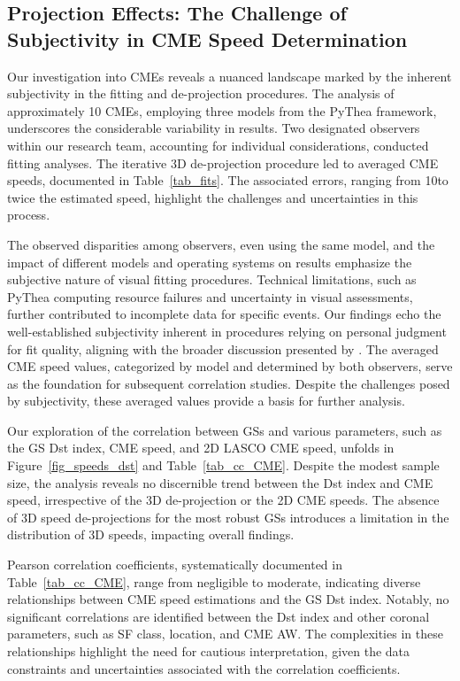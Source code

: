 \subsection{Projection Effects: The Challenge of Subjectivity in CME Speed Determination}
Our investigation into CMEs reveals a nuanced landscape marked by the inherent subjectivity in the fitting and de-projection procedures. The analysis of approximately 10 CMEs, employing three models from the PyThea framework, underscores the considerable variability in results. Two designated observers within our research team, accounting for individual considerations, conducted fitting analyses. The iterative 3D de-projection procedure led to averaged CME speeds, documented in Table~\ref{tab_fits}. The associated errors, ranging from 10\kms to twice the estimated speed, highlight the challenges and uncertainties in this process.

The observed disparities among observers, even using the same model, and the impact of different models and operating systems on results emphasize the subjective nature of visual fitting procedures. Technical limitations, such as PyThea computing resource failures and uncertainty in visual assessments, further contributed to incomplete data for specific events. Our findings echo the well-established subjectivity inherent in procedures relying on personal judgment for fit quality, aligning with the broader discussion presented by \citet{verbeke_2022}.
The averaged CME speed values, categorized by model and determined by both observers, serve as the foundation for subsequent correlation studies. Despite the challenges posed by subjectivity, these averaged values provide a basis for further analysis.

Our exploration of the correlation between GSs and various parameters, such as the GS Dst index, CME speed, and 2D LASCO CME speed, unfolds in Figure~\ref{fig_speeds_dst} and Table~\ref{tab_cc_CME}. Despite the modest sample size, the analysis reveals no discernible trend between the Dst index and CME speed, irrespective of the 3D de-projection or the 2D CME speeds. The absence of 3D speed de-projections for the most robust GSs introduces a limitation in the distribution of 3D speeds, impacting overall findings.

Pearson correlation coefficients, systematically documented in Table~\ref{tab_cc_CME}, range from negligible to moderate, indicating diverse relationships between CME speed estimations and the GS Dst index. Notably, no significant correlations are identified between the Dst index and other coronal parameters, such as SF class, location, and CME AW. The complexities in these relationships highlight the need for cautious interpretation, given the data constraints and uncertainties associated with the correlation coefficients.

